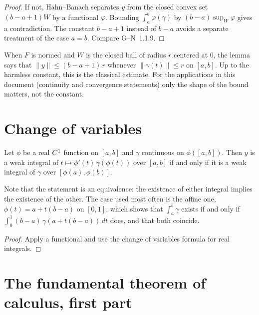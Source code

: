 \begin{proof}
  \leanok
  If not, Hahn--Banach separates $y$ from the closed convex set $(b - a + 1)W$ by a functional
  $\varphi$. Bounding $\int_a^b \varphi(\gamma)$ by $(b - a)\sup_W \varphi$ gives a
  contradiction. The constant $b - a + 1$ instead of $b - a$ avoids a separate treatment of
  the case $a = b$. Compare G--N~1.1.9.
\end{proof}

\begin{remark}
  When $F$ is normed and $W$ is the closed ball of radius $r$ centered at $0$, the lemma says
  that $\|y\| \leq (b - a + 1)\, r$ whenever $\|\gamma(t)\| \leq r$ on $[a, b]$. Up to the
  harmless constant, this is the classical estimate. For the applications in this document
  (continuity and convergence statements) only the shape of the bound matters, not the
  constant.
\end{remark}

\section{Change of variables}

\begin{proposition}
  \label{prop:change-of-variables}
  \leanok
  Let $\phi$ be a real $C^{1}$ function on $[a, b]$ and $\gamma$ continuous on
  $\phi([a, b])$. Then $y$ is a weak integral of $t \mapsto \phi'(t)\,\gamma(\phi(t))$ over
  $[a, b]$ if and only if it is a weak integral of $\gamma$ over $[\phi(a), \phi(b)]$.
\end{proposition}

Note that the statement is an equivalence: the existence of either integral implies the
existence of the other. The case used most often is the affine one,
$\phi(t) = a + t(b - a)$ on $[0, 1]$, which shows that $\int_a^b \gamma$ exists if and only if
$\int_0^1 (b - a)\, \gamma(a + t(b - a))\, dt$ does, and that both coincide.

\begin{proof}
  \leanok
  Apply a functional and use the change of variables formula for real integrals.
\end{proof}

\section{The fundamental theorem of calculus, first part}

